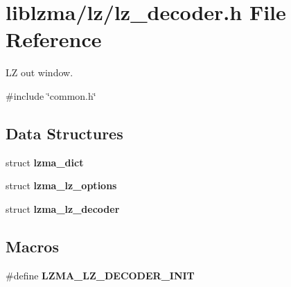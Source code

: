 \section{liblzma/lz/lz\+\_\+decoder.h File Reference}
\label{lz__decoder_8h}


LZ out window.  


{\ttfamily \#include \char`\"{}common.\+h\char`\"{}}\newline
\subsection*{Data Structures}
\begin{DoxyCompactItemize}
\item 
struct \textbf{ lzma\+\_\+dict}
\item 
struct \textbf{ lzma\+\_\+lz\+\_\+options}
\item 
struct \textbf{ lzma\+\_\+lz\+\_\+decoder}
\end{DoxyCompactItemize}
\subsection*{Macros}
\begin{DoxyCompactItemize}
\item 
\#define {\bfseries L\+Z\+M\+A\+\_\+\+L\+Z\+\_\+\+D\+E\+C\+O\+D\+E\+R\+\_\+\+I\+N\+IT}
\end{DoxyCompactItemize}
